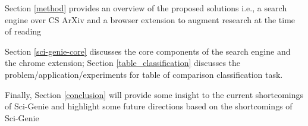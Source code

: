 Section \ref{method} provides an overview of the proposed solutions i.e., a search engine over CS ArXiv and a browser extension to augment research at the time of reading 

Section \ref{sci-genie-core} discusses the core components of the search engine and the chrome extension; Section \ref{table_classification}
discusses the problem/application/experiments for table of comparison classification task.

Finally, Section \ref{conclusion} will provide some insight to the current shortcomings of Sci-Genie and highlight some future directions based on the shortcomings of Sci-Genie 